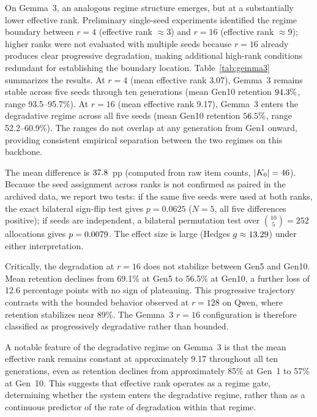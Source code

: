 \documentclass[a4paper,fleqn]{cas-dc}
\newif\ifshowchanges
\newcommand{\rev}[1]{\ifshowchanges{\color{blue}#1}\else{#1}\fi}
\begin{document}
On Gemma~3, an analogous regime structure emerges, but at a substantially lower
effective rank. Preliminary single-seed experiments identified the regime
boundary between $r=4$ (effective rank ${\approx}$3) and $r=16$ (effective rank
${\approx}$9); higher ranks were not evaluated with multiple seeds because $r=16$
already produces clear progressive degradation, making additional high-rank
conditions redundant for establishing the boundary location.
Table~\ref{tab:gemma3} summarizes the results. At $r=4$ (mean
effective rank 3.07), Gemma~3 remains stable across five seeds through ten
generations (mean Gen10 retention \rev{$94.3\%$, range 93.5--95.7\%}).
At $r=16$ (mean effective rank 9.17), Gemma~3 enters the degradative regime
across all five seeds (mean Gen10 retention \rev{$56.5\%$,
range 52.2--60.9\%}). The ranges do not
overlap at any generation from Gen1 onward, providing consistent empirical
separation between the two regimes on this backbone.

\rev{The mean difference is $37.8$~pp (computed from raw item counts,
$|K_0|=46$). Because the seed assignment across ranks is not confirmed
as paired in the archived data, we report two tests: if the same five seeds were
used at both ranks, the exact bilateral sign-flip test gives $p=0.0625$
($N=5$, all five differences positive); if seeds are independent, a bilateral
permutation test over $\binom{10}{5}=252$ allocations gives
$p=0.0079$. The effect size is large (Hedges $g \approx 13.29$)
under either interpretation.}

Critically, the degradation at $r=16$ does not stabilize between Gen5 and
Gen10. Mean retention declines from 69.1\% at Gen5 to 56.5\% at Gen10, a
further loss of 12.6 percentage points with no sign of plateauing. This
progressive trajectory contrasts with the bounded behavior observed at $r=128$
on Qwen, where retention stabilizes near 89\%. The Gemma~3 $r=16$
configuration is therefore classified as progressively degradative rather than
bounded.

A notable feature of the degradative regime on Gemma~3 is that the mean
effective rank remains constant at approximately 9.17 throughout all ten
generations, \rev{even as retention declines from approximately 85\% at Gen~1 to 57\% at Gen~10}. This suggests that
effective rank operates as a regime gate, determining whether the system
enters the degradative regime, rather than as a continuous predictor of the
rate of degradation within that regime.
\end{document}
